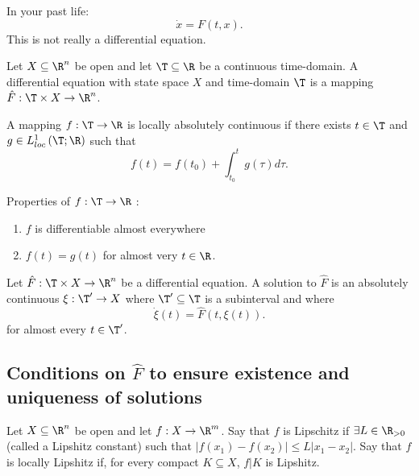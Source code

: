 In your past life: 
\[
	\dot{x}  = F(t, x)
.\] 
This is not really a differential equation.


\begin{definition}
	Let $X \subseteq \R^{n}$ be open and let $\T\subseteq \R$ be a continuous time-domain. A differential equation with state space $X$ and time-domain $\T$ is a mapping $\hat{F}: \T \times X \to \R^{n}$. 
\end{definition}

\begin{definition}	
	A mapping $f : \T \to \R$ is locally absolutely continuous if there exists $t \in \T$ and $g \in  L^{1}_{loc}\left( \T; \R \right) $ such that 
	\[
		f\left( t \right) = f\left( t_0 \right) + \int_{t_0}^{t} g\left( \tau  \right) d\tau  
	.\] 

	Properties of $f : \T \to \R$ :
	\begin{enumerate}
		\item $f$ is differentiable almost everywhere
		\item $f\left( t \right)   = g\left( t \right) $ for almost very $t \in  \R$.
	\end{enumerate}
\end{definition}

\begin{definition}
	Let $\hat{F} : \T \times X \to \R ^{n}$ be a differential equation. A solution to $\hat{F}$ is an absolutely continuous $\xi  : \T' \to X$ where $\T' \subseteq \T$ is a subinterval and where 
	\[
		\dot{\xi } \left( t \right)  = \hat{F}\left( t, \xi \left( t \right)  \right) 
	.\] 
	for almost every $t \in  \T'$. 
\end{definition}

\subsection{Conditions on $\hat{F}$ to ensure existence and uniqueness of solutions} 

\begin{definition}
	Let $X \subseteq \R^{n}$ be open and let $f : X \to \R^{m}$. Say that $f$ is Lipschitz if $\exists    L \in  \R_{>0}$ (called a Lipshitz constant) such that $|f\left( x_1 \right)  - f\left( x_2 \right) | \le L|x_1 - x_2|$. Say that $f$ is locally Lipshitz if, for every compact $K \subseteq X$, $f|K$ is Lipshitz. 
\end{definition}

